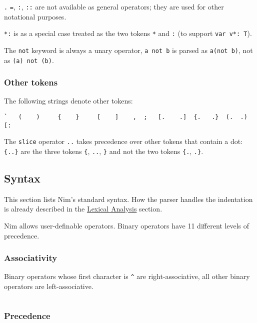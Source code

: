 \texttt{.} \texttt{=}, \texttt{:}, \texttt{::} are not available as
general operators; they are used for other notational purposes.

\texttt{*:} is as a special case treated as the two tokens \texttt{*}
and \texttt{:} (to support \texttt{var\ v*:\ T}).

The \texttt{not} keyword is always a unary operator, \texttt{a\ not\ b}
is parsed as \texttt{a(not\ b)}, not as \texttt{(a)\ not\ (b)}.

\hypertarget{other-tokens}{%
\subsubsection{Other tokens}\label{other-tokens}}

The following strings denote other tokens:

\begin{verbatim}
`   (    )     {    }     [    ]    ,  ;   [.    .]  {.   .}  (.  .)  [:
\end{verbatim}

The \texttt{slice} operator \texttt{..} takes precedence over other
tokens that contain a dot: \texttt{\{..\}} are the three tokens
\texttt{\{}, \texttt{..}, \texttt{\}} and not the two tokens
\texttt{\{.}, \texttt{.\}}.

\hypertarget{syntax}{%
\subsection{Syntax}\label{syntax}}

This section lists Nim's standard syntax. How the parser handles the
indentation is already described in the
\protect\hyperlink{lexical-analysis}{Lexical Analysis} section.

Nim allows user-definable operators. Binary operators have 11 different
levels of precedence.

\hypertarget{associativity}{%
\subsubsection{Associativity}\label{associativity}}

Binary operators whose first character is \texttt{\^{}} are
right-associative, all other binary operators are left-associative.

\begin{verbatim}
\end{verbatim}

\hypertarget{precedence}{%
\subsubsection{Precedence}\label{precedence}}

